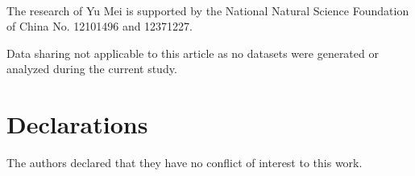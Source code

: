 \documentclass[12pt,reqno]{amsart}
\numberwithin{equation}{section}
\begin{document}
\

The research of Yu Mei is supported by the National Natural Science Foundation of China No. 12101496 and 12371227.	

\bigskip

Data sharing not applicable to this article as no datasets were generated or analyzed during
the current study.

\section*{Declarations}

 The authors declared that they have no conflict of interest to this work.



	
%
%
%
%
%
%		
%		
	
	
\end{document}
